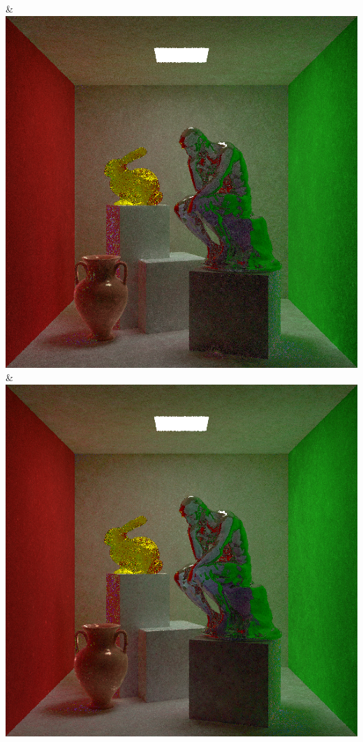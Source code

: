 & \includegraphics[width=\linewidth]{figures/py/tests/sppc_optimization/nrc+sppc+Rej70_1spp_thinker.png}
& \includegraphics[width=\linewidth]{figures/py/tests/sppc_optimization/nrc+sppc+Rej70+RejN_1spp_thinker.png}
